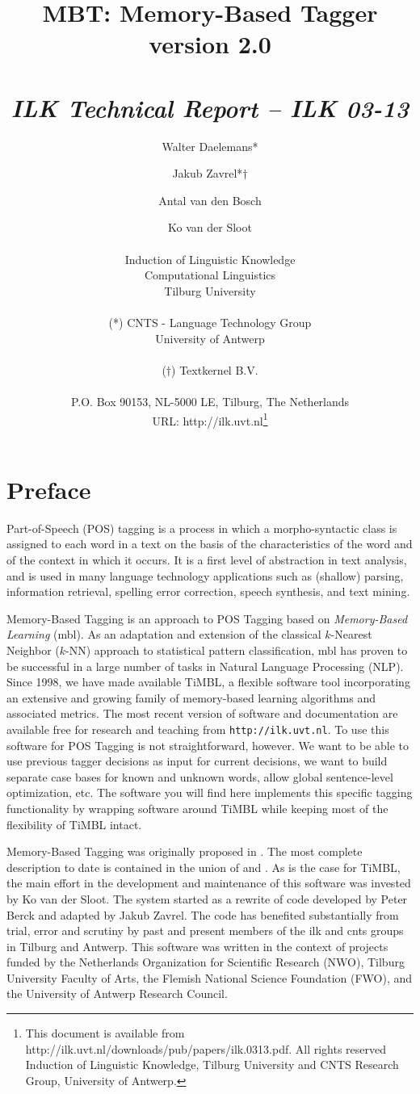 \documentclass{report}
\author{Walter Daelemans* \and Jakub Zavrel*$\dagger$ \and
	Antal van den Bosch \and Ko van der Sloot\\ \ \\
	Induction of Linguistic Knowledge\\
	Computational Linguistics\\ 
        Tilburg University \\ \\
	(*) CNTS - Language Technology Group\\
	University of Antwerp\\ \\
	($\dagger$) Textkernel B.V.\\ \\
        P.O. Box 90153, NL-5000 LE, Tilburg, The Netherlands \\ 
        URL: http://ilk.uvt.nl\thanks{This document is available from
	http://ilk.uvt.nl/downloads/pub/papers/ilk.0313.pdf. All rights reserved
	Induction of Linguistic Knowledge, Tilburg University and 
        CNTS Research Group, University of Antwerp.}}
\title{{\huge MBT: Memory-Based Tagger} \\ \vspace*{0.5cm}
{\bf version 2.0} \\ \vspace*{0.5cm}{\huge Reference Guide}\\
\vspace*{1cm} {\it ILK Technical Report -- ILK 03-13}}
\begin{document}

\maketitle

\tableofcontents

\chapter*{Preface}

Part-of-Speech (POS) tagging is a process in which a morpho-syntactic
class is assigned to each word in a text on the basis of the
characteristics of the word and of the context in which it occurs. It
is a first level of abstraction in text analysis, and is used in many
language technology applications such as (shallow) parsing,
information retrieval, spelling error correction, speech synthesis, and
text mining. 

Memory-Based Tagging is an approach to POS Tagging based on {\em
Memory-Based Learning} ({\sc mbl}).  As an adaptation and extension of
the classical $k$-Nearest Neighbor ($k$-NN) approach to statistical
pattern classification, {\sc mbl} has proven to be successful in a
large number of tasks in Natural Language Processing (NLP). Since
1998, we have made available TiMBL, a flexible software tool
incorporating an extensive and growing family of memory-based learning
algorithms and associated metrics. The most recent version of software
and documentation are available free for research and teaching from
{\tt http://ilk.uvt.nl}.  To use this software for POS Tagging is not
straightforward, however. We want to be able to use previous tagger
decisions as input for current decisions, we want to build separate
case bases for known and unknown words, allow global sentence-level
optimization, etc.  The software you will find here implements this
specific tagging functionality by wrapping software around TiMBL while
keeping most of the flexibility of TiMBL intact.

Memory-Based Tagging was originally proposed in
\cite{Daelemans95}. The most complete description to date is contained
in the union of \cite{Daelemans+96} and \cite{Zavrel+99}.  As is the
case for TiMBL, the main effort in the development and
maintenance of this software was invested by Ko van der Sloot. The
system started as a rewrite of code developed by Peter Berck and
adapted by Jakub Zavrel. The code has benefited substantially from
trial, error and scrutiny by past and present members of the {\sc ilk}
and {\sc cnts} groups in Tilburg and Antwerp. This software was
written in the context of projects funded by the Netherlands
Organization for Scientific Research (NWO), Tilburg University Faculty
of Arts, the Flemish National Science Foundation (FWO), and the
University of Antwerp Research Council.
\end{document}
